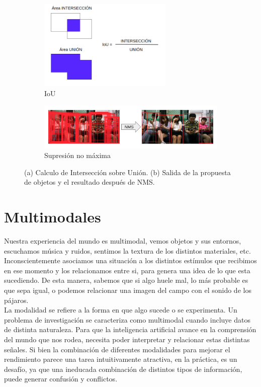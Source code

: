 \begin{figure}[]
	\begin{subfigure}{.5\textwidth}
		\centering
		\includegraphics[width=0.7\textwidth]{img/iou.png}
		\caption{IoU}
		\label{fig:IoU}
	\end{subfigure}
	\begin{subfigure}{.5\textwidth}
		\centering
		\includegraphics[width=1.1\textwidth]{img/NMS.png}
		\caption{Supresión no máxima}
		\label{fig:NMS}
	\end{subfigure}
	\caption{(a) Calculo de Intersección sobre Unión. (b) Salida de la propuesta de objetos y el resultado después de NMS.}
		\label{fig:RP}
\end{figure}

\section{Multimodales} \label{sec:multimodales}

Nuestra experiencia del mundo es multimodal, vemos objetos y sus entornos, escuchamos música y ruidos, sentimos la textura de los distintos materiales, etc.  Inconscientemente asociamos una situación a los distintos estímulos que recibimos en ese momento y los relacionamos entre si, para genera una idea de lo que esta sucediendo. De esta manera, sabemos que si algo huele mal, lo más probable es que sepa igual, o podemos relacionar una imagen del campo con el sonido de los pájaros.\\

La modalidad se refiere a la forma en que algo sucede o se experimenta. Un problema de investigación se caracteriza como multimodal cuando incluye datos de distinta naturaleza. Para que la inteligencia artificial avance en la comprensión del mundo que nos rodea, necesita poder interpretar y relacionar estas distintas señales. Si bien la combinación de diferentes modalidades para mejorar el rendimiento parece una tarea intuitivamente atractiva, en la práctica, es un desafío, ya que una ineducada combinación de distintos tipos de información, puede generar confusión y conflictos. 


